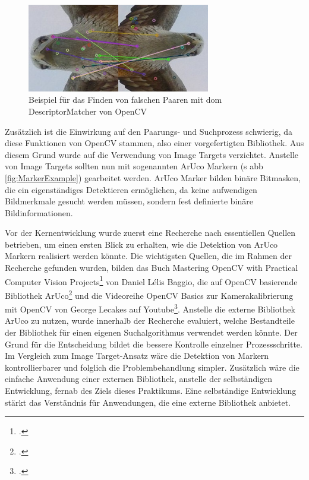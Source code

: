 \begin{figure}[H]
\centering
\includegraphics[width=8cm]{Bilder/ZielsetzungUndVorgehensweise/1428488468101951.jpg}
\caption[Beispiel für das Finden von falschen Paaren mit dem DescriptorMatcher von OpenCV]{Beispiel für das Finden von falschen Paaren mit dom DescriptorMatcher von OpenCV\protect\footnotemark}
\label{fig:DescriptorMatcherWrong}
\end{figure}

\noindent Zusätzlich ist die Einwirkung auf den Paarungs- und Suchprozess schwierig, da diese Funktionen von OpenCV stammen, also einer vorgefertigten Bibliothek. Aus diesem Grund wurde auf die Verwendung von Image Targets verzichtet. Anstelle von Image Targets sollten nun mit sogenannten ArUco Markern (\acs{s} \acs{abb} \ref{fig:MarkerExample}) gearbeitet werden. ArUco Marker bilden binäre Bitmasken, die ein eigenständiges Detektieren ermöglichen, da keine aufwendigen Bildmerkmale gesucht werden müssen, sondern fest definierte binäre Bildinformationen.

Vor der Kernentwicklung wurde zuerst eine Recherche nach essentiellen Quellen betrieben, um einen ersten Blick zu erhalten, wie die Detektion von ArUco Markern realisiert werden könnte. Die wichtigsten Quellen, die im Rahmen der Recherche gefunden wurden, bilden das Buch \glqq Mastering OpenCV with Practical Computer Vision Projects\grqq \footcite{Baggioonline} von Daniel Lélis Baggio, die auf OpenCV basierende Bibliothek \glqq ArUco\grqq \footcite{arucoonline} und die Videoreihe \glqq OpenCV Basics\grqq{} zur Kamerakalibrierung mit OpenCV von George Lecakes auf Youtube\footcite{LecakesOpenCV}. Anstelle die externe Bibliothek ArUco zu nutzen, wurde innerhalb der Recherche evaluiert, welche Bestandteile der Bibliothek für einen eigenen Suchalgorithmus verwendet werden könnte. Der Grund für die Entscheidung bildet die bessere Kontrolle einzelner Prozessschritte. Im Vergleich zum Image Target-Ansatz wäre die Detektion von Markern kontrollierbarer und folglich die Problembehandlung simpler. Zusätzlich wäre die einfache Anwendung einer externen Bibliothek, anstelle der selbständigen Entwicklung, fernab des Ziels dieses Praktikums. Eine selbständige Entwicklung stärkt das Verständnis für Anwendungen, die eine externe Bibliothek anbietet.

